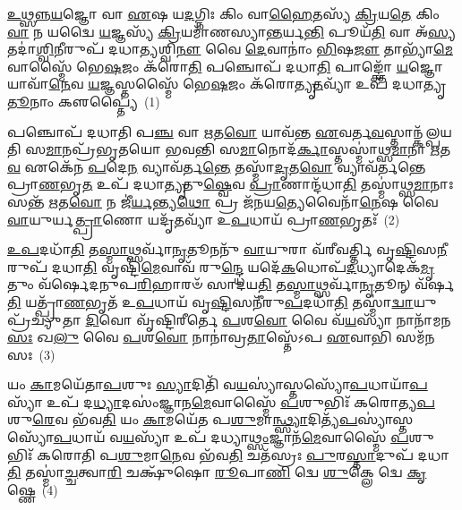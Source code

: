 \setcounter{anuvakam}{0}
\-\ul{𑌉}\-\-\ul{𑌥𑍍𑌸}\-\-\ul{𑌨𑍍𑌨}\-\-\ul{𑌯}\-𑌜𑍍𑌞𑍋 𑌵𑌾 \ul{𑌏}\-𑌷 𑌯\-\ul{𑌦}\-𑌗𑍍𑌨𑌿𑌃 𑌕𑌿𑌂 𑌵𑌾\-\ul{𑌹𑍈}\-𑌤𑌸𑍍𑌯᳴ \ul{𑌕𑍍𑌰𑌿}\-𑌯\-\ul{𑌤𑍇} 𑌕𑌿𑌂 \ul{𑌵𑌾} 𑌨 𑌯𑌦𑍍𑌵𑍈 \ul{𑌯}\-𑌜𑍍𑌞𑌸𑍍𑌯᳴ \ul{𑌕𑍍𑌰𑌿}\-𑌯𑌮𑌾᳴𑌣𑌸𑍍𑌯𑌾\-\ul{𑌨𑍍𑌤}\-𑌰𑍍𑌯\-\ul{𑌨𑍍𑌤𑌿} 𑌪𑍂𑌯᳴\-\ul{𑌤𑌿} 𑌵𑌾 𑌅᳴\-\ul{𑌸𑍍𑌯} 𑌤𑌦𑌾॑\-\ul{𑌶𑍍𑌵𑌿}\-𑌨𑍀𑌰𑍁𑌪᳴ 𑌦𑌧𑌾\-\ul{𑌤𑍍𑌯}\-𑌶𑍍𑌵𑌿\-\ul{𑌨𑍗} 𑌵𑍈 \ul{𑌦𑍇}\-𑌵𑌾𑌨𑌾𑌂॑ \ul{𑌭𑌿}\-𑌷\-\ul{𑌜𑍗} 𑌤𑌾𑌭𑍍𑌯𑌾᳴\-\ul{𑌮𑍇}\-𑌵𑌾𑌸𑍍𑌮𑍈᳴ 𑌭𑍇\-\ul{𑌷}\-𑌜𑌂 𑌕᳴𑌰𑍋\-\ul{𑌤𑌿} 𑌪𑌞𑍍𑌚𑍋𑌪᳴ 𑌦𑌧𑌾\-\ul{𑌤𑌿} 𑌪𑌾𑌙𑍍𑌕𑍍𑌤𑍋᳴ \ul{𑌯}\-𑌜𑍍𑌞𑍋 𑌯𑌾𑌵𑌾᳴\-\ul{𑌨𑍇}\-𑌵 \ul{𑌯}\-𑌜𑍍𑌞𑌸𑍍𑌤𑌸𑍍𑌮𑍈᳴ 𑌭𑍇\-\ul{𑌷}\-𑌜𑌂 𑌕᳴𑌰𑍋𑌤𑍍𑌯𑍃\-\ul{𑌤}\-𑌵𑍍𑌯𑌾᳴ 𑌉𑌪᳴ 𑌦𑌧𑌾𑌤𑍍𑌯𑍃\-\ul{𑌤𑍂}\-𑌨𑌾𑌂 𑌕𑍢𑌪𑍍𑌤𑍍𑌯𑍈॑~(1)

𑌪𑌞𑍍𑌚𑍋𑌪᳴ 𑌦𑌧𑌾𑌤𑌿 𑌪\-\ul{𑌞𑍍𑌚} 𑌵𑌾 \ul{𑌋}\-𑌤\-\ul{𑌵𑍋} 𑌯𑌾𑌵᳴𑌨𑍍𑌤 \ul{𑌏}\-𑌵𑌰𑍍𑌤\-\ul{𑌵}\-𑌸𑍍𑌤𑌾𑌨𑍍𑌕᳴𑌲𑍍𑌪𑌯𑌤𑌿 𑌸\-\ul{𑌮𑌾}\-𑌨𑌪𑍍𑌰᳴𑌭𑍃𑌤𑌯𑍋 𑌭𑌵𑌨𑍍𑌤𑌿 𑌸\-\ul{𑌮𑌾}\-𑌨𑍋𑌦᳴\-\ul{𑌰𑍍𑌕𑌾}\-𑌸𑍍𑌤𑌸𑍍𑌮𑌾॑𑌥𑍍𑌸\-\ul{𑌮𑌾}\-𑌨𑌾 \ul{𑌋}\-𑌤\-\ul{𑌵} 𑌏𑌕𑍇᳴𑌨 \ul{𑌪}\-𑌦𑍇\-\ul{𑌨} 𑌵𑍍𑌯𑌾𑌵᳴𑌰𑍍𑌤\-\ul{𑌨𑍍𑌤𑍇} 𑌤𑌸𑍍𑌮𑌾᳴\-\ul{𑌦𑍃}\-𑌤\-\ul{𑌵𑍋} 𑌵𑍍𑌯𑌾𑌵᳴𑌰𑍍𑌤𑌨𑍍𑌤𑍇 𑌪𑍍𑌰𑌾\-\ul{𑌣}\-𑌭𑍃\-\ul{𑌤} 𑌉𑌪᳴ 𑌦𑌧𑌾\-\ul{𑌤𑍍𑌯𑍃}\-𑌤𑍁\-\ul{𑌷𑍍𑌵𑍇}\-𑌵 \ul{𑌪𑍍𑌰𑌾}\-𑌣𑌾𑌨𑍍𑌦᳴𑌧𑌾\-\ul{𑌤𑌿} 𑌤𑌸𑍍𑌮𑌾॑𑌥𑍍𑌸\-\ul{𑌮𑌾}\-𑌨𑌾𑌃 𑌸𑌨𑍍𑌤᳴ \ul{𑌋}\-𑌤\-\ul{𑌵𑍋} 𑌨 𑌜𑍀॑\-\ul{𑌰𑍍𑌯}\-𑌨𑍍𑌤𑍍𑌯\-\ul{𑌥𑍋} 𑌪𑍍𑌰 𑌜᳴𑌨𑌯\-\ul{𑌤𑍍𑌯𑍇}\-𑌵𑍈𑌨𑌾᳴\-\ul{𑌨𑍇}\-𑌷 𑌵𑍈 \ul{𑌵𑌾}\-𑌯𑍁𑌰𑍍𑌯\-\ul{𑌤𑍍𑌪𑍍𑌰𑌾}\-𑌣𑍋 𑌯𑌦𑍃᳴\-\ul{𑌤}\-𑌵𑍍𑌯𑌾᳴ 𑌉\-\ul{𑌪}\-𑌧𑌾𑌯᳴ 𑌪𑍍𑌰𑌾\-\ul{𑌣}\-𑌭𑍃𑌤𑌃᳴~(2)

\-\ul{𑌉}\-\-\ul{𑌪}\-𑌦𑌧𑌾᳴\-\ul{𑌤𑌿} 𑌤\-\ul{𑌸𑍍𑌮𑌾}\-𑌥𑍍𑌸𑌰𑍍𑌵𑌾᳴\-\ul{𑌨𑍃}\-𑌤𑍂𑌨𑌨𑍁᳴ \ul{𑌵𑌾}\-𑌯𑍁𑌰𑌾 𑌵᳴𑌰𑍀𑌵𑌰𑍍𑌤𑍍𑌤𑌿 𑌵𑍃\-\ul{𑌷𑍍𑌟𑌿}\-𑌸\-\ul{𑌨𑍀}\-𑌰𑍁𑌪᳴ 𑌦𑌧𑌾\-\ul{𑌤𑌿} 𑌵𑍃𑌷𑍍𑌟𑌿᳴\-\ul{𑌮𑍇}\-𑌵𑌾𑌵᳴ 𑌰𑍁\-\ul{𑌨𑍍𑌦𑍍𑌧𑍇} 𑌯𑌦𑍇᳴\-\ul{𑌕}\-𑌧𑍋𑌪᳴\-\ul{𑌦}\-𑌧𑍍𑌯𑌾𑌦𑍇𑌕᳴\-\ul{𑌮𑍃}\-𑌤𑍁𑌂 𑌵᳴𑌰𑍍\mbox{}𑌷𑍇𑌦𑌨𑍁𑌪\-\ul{𑌰𑌿}\-𑌹𑌾𑌰𑍞᳴ 𑌸𑌾𑌦𑌯\-\ul{𑌤𑌿} 𑌤\-\ul{𑌸𑍍𑌮𑌾}\-𑌥𑍍𑌸𑌰𑍍𑌵𑌾᳴\-\ul{𑌨𑍃}\-𑌤𑍂𑌨𑍍 𑌵᳴𑌰𑍍\mbox{}𑌷\-\ul{𑌤𑌿} 𑌯𑌤𑍍𑌪𑍍𑌰𑌾᳴\-\ul{𑌣}\-𑌭𑍃𑌤᳴ 𑌉\-\ul{𑌪}\-𑌧𑌾𑌯᳴ 𑌵𑍃\-\ul{𑌷𑍍𑌟𑌿}\-𑌸𑌨𑍀᳴𑌰𑍁\-\ul{𑌪}\-𑌦𑌧𑌾᳴\-\ul{𑌤𑌿} 𑌤𑌸𑍍𑌮𑌾॑\-\ul{𑌦𑍍𑌵𑌾}\-𑌯𑍁𑌪𑍍𑌰᳴𑌚𑍍𑌯𑍁𑌤𑌾 \ul{𑌦𑌿}\-𑌵𑍋 𑌵𑍃᳴𑌷𑍍𑌟𑌿𑌰𑍀𑌰𑍍𑌤𑍇 \ul{𑌪}\-𑌶\-\ul{𑌵𑍋} 𑌵𑍈 𑌵᳴\-\ul{𑌯}\-𑌸𑍍𑌯𑌾᳴ 𑌨𑌾𑌨𑌾᳴𑌮𑌨\-\ul{𑌸𑌃} 𑌖\-\ul{𑌲𑍁} 𑌵𑍈 \ul{𑌪}\-𑌶\-\ul{𑌵𑍋} 𑌨𑌾𑌨𑌾॑𑌵𑍍𑌰\-\ul{𑌤𑌾}\-𑌸𑍍𑌤𑍇᳴\-𑌽𑌪 \ul{𑌏}\-𑌵𑌾𑌭𑌿 𑌸𑌮᳴𑌨𑌸𑌃~(3)

𑌯𑌂 \ul{𑌕𑌾}\-𑌮𑌯𑍇᳴𑌤𑌾\-\ul{𑌪}\-𑌶𑍁𑌃 \ul{𑌸𑍍𑌯𑌾}\-𑌦𑌿𑌤𑌿᳴ 𑌵\-\ul{𑌯}\-𑌸𑍍𑌯𑌾॑𑌸𑍍𑌤𑌸𑍍𑌯𑍋᳴\-\ul{𑌪}\-𑌧𑌾𑌯𑌾᳴\-\ul{𑌪}\-𑌸𑍍𑌯𑌾᳴ 𑌉𑌪᳴ 𑌦\-\ul{𑌧𑍍𑌯𑌾}\-𑌦𑌸𑌂॑𑌜𑍍𑌞𑌾𑌨\-\ul{𑌮𑍇}\-𑌵𑌾𑌸𑍍𑌮𑍈᳴ \ul{𑌪}\-𑌶𑍁𑌭𑌿𑌃᳴ 𑌕𑌰𑍋𑌤𑍍𑌯\-\ul{𑌪}\-𑌶𑍁\-\ul{𑌰𑍇}\-𑌵 𑌭᳴𑌵\-\ul{𑌤𑌿} 𑌯𑌂 \ul{𑌕𑌾}\-𑌮𑌯𑍇᳴𑌤 𑌪\-\ul{𑌶𑍁}\-𑌮𑌾\-\ul{𑌨𑍍𑌥𑍍𑌸𑍍𑌯𑌾}\-𑌦𑌿𑌤𑍍𑌯᳴\-\ul{𑌪}\-𑌸𑍍𑌯𑌾॑𑌸𑍍𑌤𑌸𑍍𑌯𑍋᳴\-\ul{𑌪}\-𑌧𑌾𑌯᳴ 𑌵\-\ul{𑌯}\-𑌸𑍍𑌯𑌾᳴ 𑌉𑌪᳴ 𑌦𑌧𑍍𑌯𑌾\-\ul{𑌥𑍍𑌸𑌂}\-𑌜𑍍𑌞𑌾𑌨᳴\-\ul{𑌮𑍇}\-𑌵𑌾𑌸𑍍𑌮𑍈᳴ \ul{𑌪}\-𑌶𑍁𑌭𑌿𑌃᳴ 𑌕𑌰𑍋𑌤𑌿 𑌪\-\ul{𑌶𑍁}\-𑌮𑌾\-\ul{𑌨𑍇}\-𑌵 𑌭᳴𑌵\-\ul{𑌤𑌿} 𑌚𑌤᳴𑌸𑍍𑌰𑌃 \ul{𑌪𑍁}\-𑌰\-\ul{𑌸𑍍𑌤𑌾}\-𑌦𑍁𑌪᳴ 𑌦𑌧𑌾\-\ul{𑌤𑌿} 𑌤𑌸𑍍𑌮𑌾॑\-\ul{𑌚𑍍𑌚}\-𑌤𑍍𑌵𑌾\-\ul{𑌰𑌿} 𑌚𑌕𑍍𑌷𑍁᳴𑌷𑍋 \ul{𑌰𑍂}\-𑌪𑌾\-\ul{𑌣𑌿} 𑌦𑍍𑌵𑍇 \ul{𑌶𑍁}\-𑌕𑍍𑌲𑍇 𑌦𑍍𑌵𑍇 \ul{𑌕𑍃}\-𑌷𑍍𑌣𑍇~(4)

